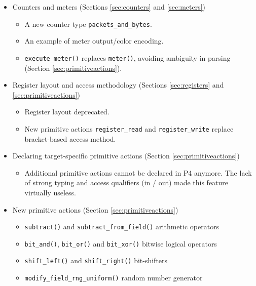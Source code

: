 \documentclass[12pt]{article}
\begin{document}
\begin{itemize}

\item Counters and meters (Sections \ref{sec:counters} and \ref{sec:meters})
  \begin{itemize}
  \item A new counter type \texttt{packets_and_bytes}.
  \item An example of meter output/color encoding.
  \item \texttt{execute_meter()} replaces \texttt{meter()}, avoiding
  ambiguity in parsing (Section \ref{sec:primitiveactions}). 
  \end{itemize}

\item Register layout and access methodology (Sections \ref{sec:registers} and \ref{sec:primitiveactions})
  \begin{itemize}
  \item Register layout deprecated.  
  \item New primitive actions \texttt{register_read} and \texttt{register_write} replace bracket-based access method. 
  \end{itemize}

\item Declaring target-specific primitive actions (Section \ref{sec:primitiveactions})
  \begin{itemize}
  \item Additional primitive actions cannot be declared in P4 anymore. The lack
  of strong typing and access qualifiers (in / out) made this feature virtually
  useless.
  \end{itemize}

\item New primitive actions (Section \ref{sec:primitiveactions})
  \begin{itemize}
  \item \texttt{subtract()} and \texttt{subtract_from_field()} arithmetic operators
  \item \texttt{bit_and()}, \texttt{bit_or()} and \texttt{bit_xor()} bitwise logical operators
  \item \texttt{shift_left()} and \texttt{shift_right()} bit-shifters 
  \item \texttt{modify_field_rng_uniform()} random number generator
  \end{itemize}


\end{itemize}
\end{document}
